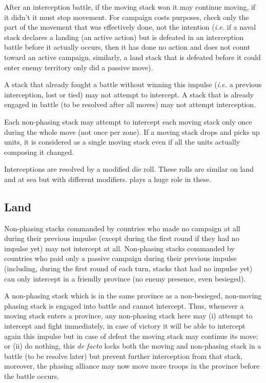 After an interception battle, if the moving stack won it may continue moving,
if it didn't it must stop movement. For campaign costs purposes, check only
the part of the movement that was effectively done, not the intention
(\emph{i.e.}  if a naval stack declares a landing (an active action) but is
defeated in an interception battle before it actually occurs, then it has done
no action and does not count toward an active campaign, similarly, a land
stack that is defeated before it could enter enemy territory only did a
passive move).

A stack that already fought a battle without winning this impulse (\emph{i.e.}
a previous interception, lost or tied) may not attempt to intercept. A stack
that is already engaged in battle (to be resolved after all moves) may not
attempt interception.

Each non-phasing stack may attempt to intercept each moving stack only once
during the whole move (not once per zone). If a moving stack drops and picks
up units, it is considered as a single moving stack even if all the units
actually composing it changed.

Interceptions are resolved by a modified die roll. These rolls are similar on
land and at sea but with different modifiers. \Man plays a huge role in these.

\subsection{Land}
Non-phasing stacks commanded by countries who made no campaign at all during
their previous impulse (except during the first round if they had no impulse
yet) may not intercept at all. Non-phasing stacks commanded by countries who
paid only a passive campaign during their previous impulse (including, during
the first round of each turn, stacks that had no impulse yet) can only
intercept in a friendly province (no enemy presence, even besieged).

A non-phasing stack which is in the same province as a non-besieged,
non-moving phasing stack is engaged into battle and cannot intercept. Thus,
whenever a moving stack enters a province, any non-phasing stack here may (i)
attempt to intercept and fight immediately, in case of victory it will be able
to intercept again this impulse but in case of defeat the moving stack may
continue its move; or (ii) do nothing, this \emph{de facto} locks both the
moving and non-phasing stack in a battle (to be resolve later) but prevent
further interception from that stack, moreover, the phasing alliance may now
move more troops in the province before the battle occurs.

